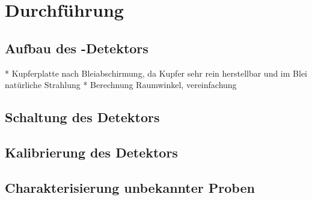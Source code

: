 \newpage
\section{Durchführung}
\label{sec:Durchführung}

\subsection{Aufbau des -Detektors}
\label{sec:AufbauDetektor}
* Kupferplatte nach Bleiabschirmung, da Kupfer sehr rein herstellbar und im Blei natürliche Strahlung
* Berechnung Raumwinkel, vereinfachung

\subsection{Schaltung des Detektors}
\label{sec:Schaltungen}

\subsection{Kalibrierung des Detektors}
\label{sec:KalibrierungBeschreibung}

\subsection{Charakterisierung unbekannter Proben}
\label{sec:CharakterisierungBeschreibung}

